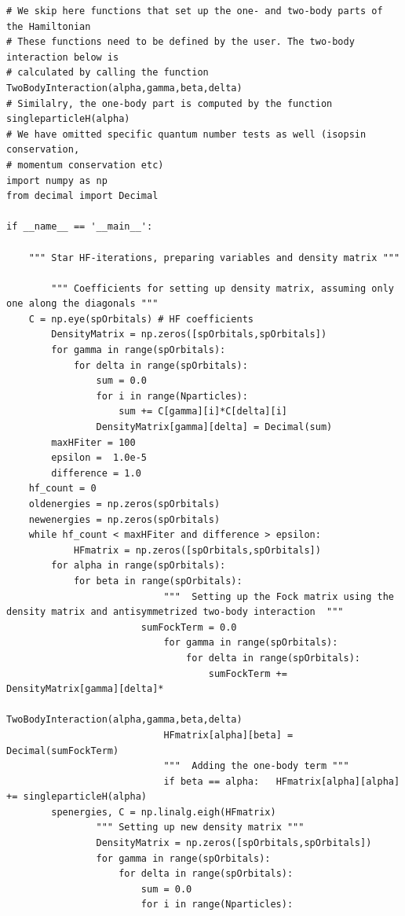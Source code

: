 \begin{lstlisting}
# We skip here functions that set up the one- and two-body parts of the Hamiltonian 
# These functions need to be defined by the user. The two-body interaction below is
# calculated by calling the function TwoBodyInteraction(alpha,gamma,beta,delta)
# Similalry, the one-body part is computed by the function singleparticleH(alpha)
# We have omitted specific quantum number tests as well (isopsin conservation, 
# momentum conservation etc)
import numpy as np 
from decimal import Decimal

if __name__ == '__main__':
	
	""" Star HF-iterations, preparing variables and density matrix """

        """ Coefficients for setting up density matrix, assuming only one along the diagonals """
	C = np.eye(spOrbitals) # HF coefficients
        DensityMatrix = np.zeros([spOrbitals,spOrbitals])
        for gamma in range(spOrbitals):
            for delta in range(spOrbitals):
                sum = 0.0
                for i in range(Nparticles):
                    sum += C[gamma][i]*C[delta][i]
                DensityMatrix[gamma][delta] = Decimal(sum)
        maxHFiter = 100
        epsilon =  1.0e-5 
        difference = 1.0
	hf_count = 0
	oldenergies = np.zeros(spOrbitals)
	newenergies = np.zeros(spOrbitals)
	while hf_count < maxHFiter and difference > epsilon:
   	        HFmatrix = np.zeros([spOrbitals,spOrbitals])		
		for alpha in range(spOrbitals):
			for beta in range(spOrbitals):
                            """  Setting up the Fock matrix using the density matrix and antisymmetrized two-body interaction  """
     		            sumFockTerm = 0.0
                            for gamma in range(spOrbitals):
                                for delta in range(spOrbitals):
                                    sumFockTerm += DensityMatrix[gamma][delta]*
                                                   TwoBodyInteraction(alpha,gamma,beta,delta)
                            HFmatrix[alpha][beta] = Decimal(sumFockTerm)
                            """  Adding the one-body term """
                            if beta == alpha:   HFmatrix[alpha][alpha] += singleparticleH(alpha)
		spenergies, C = np.linalg.eigh(HFmatrix)
                """ Setting up new density matrix """
                DensityMatrix = np.zeros([spOrbitals,spOrbitals])
                for gamma in range(spOrbitals):
                    for delta in range(spOrbitals):
                        sum = 0.0
                        for i in range(Nparticles):

\end{lstlisting}
